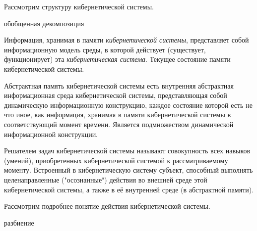 
Рассмотрим структуру кибернетической системы.
\begin{SCn}
	\begin{scnrelfromset}{обобщенная декомпозиция}
	\end{scnrelfromset}
\end{SCn}

Информация, хранимая в памяти \textit{кибернетической системы}, представляет собой информационную модель среды, в которой действует (существует, функционирует) эта \textit{кибернетическая система}. Текущее состояние памяти кибернетической системы.

Абстрактная память кибернетической системы есть внутренняя абстрактная информационная среда кибернетической системы, представляющая собой динамическую информационную  конструкцию, каждое состояние которой есть не что иное, как информация, хранимая в памяти кибернетической системы в соответствующий момент времени. Является подмножеством динамической информационной конструкции.

Решателем задач кибернетической системы называют совокупность всех навыков (умений), приобретенных кибернетической системой к рассматриваемому моменту. Встроенный в кибернетическую систему субъект, способный выполнять целенаправленные ("осознанные") действия во внешней среде этой кибернетической системы, а также в её внутренней среде (в абстрактной памяти).


Рассмотрим подробнее понятие действия кибернетической системы.

\begin{SCn}
\begin{scnrelfromset}{разбиение}
	\begin{scnindent}
	\end{scnindent}

\end{scnrelfromset}
\end{SCn}

